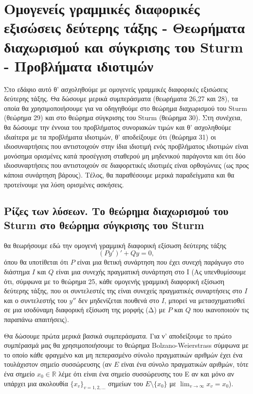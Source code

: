 \documentclass[11pt,a4paper,twoside]{book}
\newcommand{\eng}[1]{\selectlanguage{english}#1\selectlanguage{greek}}
\begin{document}
\section{Ομογενείς γραμμικές διαφορικές εξισώσεις δεύτερης τάξης - Θεωρήματα διαχωρισμού και σύγκρισης του Sturm - Προβλήματα ιδιοτιμών}

Στο εδάφιο αυτό θ' ασχοληθούμε με ομογενείς γραμμικές διαφορικές εξισώσεις δεύτερης τάξης. Θα δώσουμε μερικά συμπεράσματα (θεωρήματα 26,27 και 28), τα οποία θα χρησιμοποιήσουμε για να οδηγηθούμε στο θεώρημα διαχωρισμού του \eng{Sturm} (θεώρημα 29) και στο θεώρημα σύγκρισης του \eng{Sturm} (θεώρημα 30). Στη συνέχεια, θα δώσουμε την έννοια του προβλήματος συνοριακών τιμών και θ' ασχοληθούμε ιδιαίτερα με τα προβλήματα ιδιοτιμών, θ' αποδείξουμε ότι (θεώρημα 31) οι ιδιοσυναρτήσεις που αντιστοιχούν στην ίδια ιδιοτιμή ενός προβλήματος ιδιοτιμών είναι μονόσημα ορισμένες κατά προσέγγιση σταθερού μη μηδενικού παράγοντα και ότι δύο ιδιοσυναρτήσεις που αντιστοιχούν σε διαφορετικές ιδιοτιμές είναι ορθογώνιες (ως προς κάποια συνάρτηση βάρους). Τέλος, θα παραθέσουμε μερικά παραδείγματα και θα προτείνουμε για λύση ορισμένες ασκήσεις.

\subsection{Ρίζες των λύσεων. Το θεώρημα διαχωρισμού του Sturm στο θεώρημα σύγκρισης του Sturm}
θα θεωρήσουμε εδώ την ομογενή γραμμική διαφορική εξίσωση δεύτερης τάξης
\begin{equation}
(Py')'+Qy=0, \tag{Δ}
\end{equation}
όπου θα υποτίθεται ότι $P$ είναι μια θετική συνάρτηση που έχει συνεχή παράγωγο στο διάστημα $Ι$ και $Q$ είναι μια συνεχής πραγματική συνάρτηση στο Ι (Ας υπενθυμίσουμε ότι, σύμφωνα με το θεώρημα 25, κάθε ομογενής γραμμική διαφορική εξίσωση δεύτερης τάξης, που οι συντελεστές της είναι συνεχείς πραγματικές συναρτήσεις στο $Ι$ και ο συντελεστής του $y''$ δεν μηδενίζεται πουθενά στο $Ι$, μπορεί να μετασχηματισθεί σε μια ισοδύναμη διαφορική εξίσωση της μορφής (Δ) με $P$ και $Q$ που ικανοποιούν τις παραπάνω απαιτήσεις).

Θα δώσουμε πρώτα μερικά βασικά συμπεράσματα. Για ν' αποδείξουμε το πρώτο συμπέρασμά μας θα χρησιμοποιήσουμε το θεώρημα \eng{Bolzano-Weierstrass} σύμφωνα με το οποίο κάθε φραγμένο και μη πεπερασμένο σύνολο πραγματικών αριθμών έχει ένα τουλάχιστον σημείο συσσώρευσης (αν $Ε$ είναι ένα σύνολο πραγματικών αριθμών, τότε ένα σημείο $x_0 \in \mathbb{R}$ λέμε ότι είναι ένα σημείο συσσώρευσης του Ε αν και μόνο αν υπάρχει μια ακολουθία $\{x_v\}_{v=1,2,...}$ σημείων του $E \setminus \{x_0\}$ με $\lim_{v\to\infty} x_v = x_0$).
\end{document}
